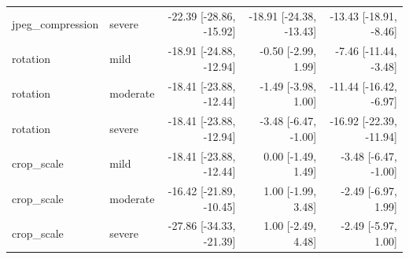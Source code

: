 \begin{tabular}{llrrr}
jpeg\_compression & severe & -22.39 [-28.86, -15.92] & -18.91 [-24.38, -13.43] & -13.43 [-18.91, -8.46] \\
rotation & mild & -18.91 [-24.88, -12.94] & -0.50 [-2.99, 1.99] & -7.46 [-11.44, -3.48] \\
rotation & moderate & -18.41 [-23.88, -12.44] & -1.49 [-3.98, 1.00] & -11.44 [-16.42, -6.97] \\
rotation & severe & -18.41 [-23.88, -12.94] & -3.48 [-6.47, -1.00] & -16.92 [-22.39, -11.94] \\
crop\_scale & mild & -18.41 [-23.88, -12.44] & 0.00 [-1.49, 1.49] & -3.48 [-6.47, -1.00] \\
crop\_scale & moderate & -16.42 [-21.89, -10.45] & 1.00 [-1.99, 3.48] & -2.49 [-6.97, 1.99] \\
crop\_scale & severe & -27.86 [-34.33, -21.39] & 1.00 [-2.49, 4.48] & -2.49 [-5.97, 1.00] \\
\bottomrule
\end{tabular}
